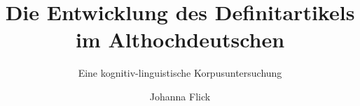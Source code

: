\author{Johanna Flick} %
\title{Die Entwicklung des Definitartikels im Althochdeutschen}  
\subtitle{Eine kognitiv-linguistische Korpusuntersuchung}

\renewcommand{\lsSeries}{eotms} %
\renewcommand{\lsSeriesNumber}{99} %



\renewcommand{\lsID}{230} %
\renewcommand{\lsISBNdigital}{000-0-000000-00-0}
\renewcommand{\lsISBNhardcover}{000-0-000000-00-0} 
